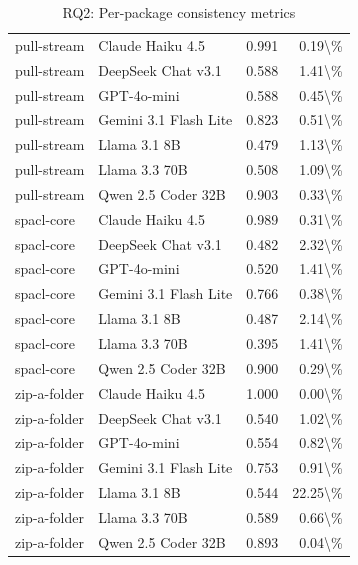 \begin{table}[htbp]
{\begin{tabular}{ll|rr}
pull-stream & Claude Haiku 4.5 & 0.991 & 0.19\textbackslash{}\% \\
pull-stream & DeepSeek Chat v3.1 & 0.588 & 1.41\textbackslash{}\% \\
pull-stream & GPT-4o-mini & 0.588 & 0.45\textbackslash{}\% \\
pull-stream & Gemini 3.1 Flash Lite & 0.823 & 0.51\textbackslash{}\% \\
pull-stream & Llama 3.1 8B & 0.479 & 1.13\textbackslash{}\% \\
pull-stream & Llama 3.3 70B & 0.508 & 1.09\textbackslash{}\% \\
pull-stream & Qwen 2.5 Coder 32B & 0.903 & 0.33\textbackslash{}\% \\
spacl-core & Claude Haiku 4.5 & 0.989 & 0.31\textbackslash{}\% \\
spacl-core & DeepSeek Chat v3.1 & 0.482 & 2.32\textbackslash{}\% \\
spacl-core & GPT-4o-mini & 0.520 & 1.41\textbackslash{}\% \\
spacl-core & Gemini 3.1 Flash Lite & 0.766 & 0.38\textbackslash{}\% \\
spacl-core & Llama 3.1 8B & 0.487 & 2.14\textbackslash{}\% \\
spacl-core & Llama 3.3 70B & 0.395 & 1.41\textbackslash{}\% \\
spacl-core & Qwen 2.5 Coder 32B & 0.900 & 0.29\textbackslash{}\% \\
zip-a-folder & Claude Haiku 4.5 & 1.000 & 0.00\textbackslash{}\% \\
zip-a-folder & DeepSeek Chat v3.1 & 0.540 & 1.02\textbackslash{}\% \\
zip-a-folder & GPT-4o-mini & 0.554 & 0.82\textbackslash{}\% \\
zip-a-folder & Gemini 3.1 Flash Lite & 0.753 & 0.91\textbackslash{}\% \\
zip-a-folder & Llama 3.1 8B & 0.544 & 22.25\textbackslash{}\% \\
zip-a-folder & Llama 3.3 70B & 0.589 & 0.66\textbackslash{}\% \\
zip-a-folder & Qwen 2.5 Coder 32B & 0.893 & 0.04\textbackslash{}\% \\
\bottomrule
\end{tabular}
}
\caption{RQ2: Per-package consistency metrics}
\label{tab:rq2-package-consistency}
\end{table}